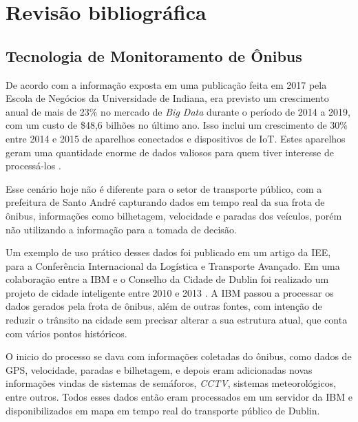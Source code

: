 \chapter{Revisão bibliográfica}
\label{Cap:RevisaoBibliografica}
\newcommand{\WidthAlgumaCoisa}{6.5 cm}

\section{Tecnologia de Monitoramento de Ônibus}

\indent
\par De acordo com a informação exposta em uma publicação feita em 2017 pela Escola de Negócios da Universidade de Indiana, era previsto um crescimento anual de mais de 23\% no mercado de \textit{Big Data} durante o período de 2014 a 2019, com um custo de \$48,6 bilhões no último ano. Isso inclui um crescimento de 30\% entre 2014 e 2015 de aparelhos conectados e dispositivos de IoT. Estes aparelhos geram uma quantidade enorme de dados valiosos para quem tiver interesse de processá-los \cite{Lee2017}.

\par Esse cenário hoje não é diferente para o setor de transporte público, com a prefeitura de Santo André capturando dados em tempo real da sua frota de ônibus, informações como bilhetagem, velocidade e paradas dos veículos, porém não utilizando a informação para a tomada de decisão.

\par Um exemplo de uso prático desses dados foi publicado em um artigo da IEE, para a Conferência Internacional da Logística e Transporte Avançado. Em uma colaboração entre a IBM e o Conselho da Cidade de Dublin foi realizado um projeto de cidade inteligente entre 2010 e 2013 \cite{BenAyed2015}. A IBM passou a processar os dados gerados pela frota de ônibus, além de outras fontes, com intenção de reduzir o trânsito na cidade sem precisar alterar a sua estrutura atual, que conta com vários pontos históricos.

\par O inicio do processo se dava com informações coletadas do ônibus, como dados de GPS, velocidade, paradas e bilhetagem, e depois eram adicionadas novas informações vindas de sistemas de semáforos, \textit{CCTV}, sistemas meteorológicos, entre outros. Todos esses dados então eram processados em um servidor da IBM e disponibilizados em mapa em tempo real do transporte público de Dublin.

